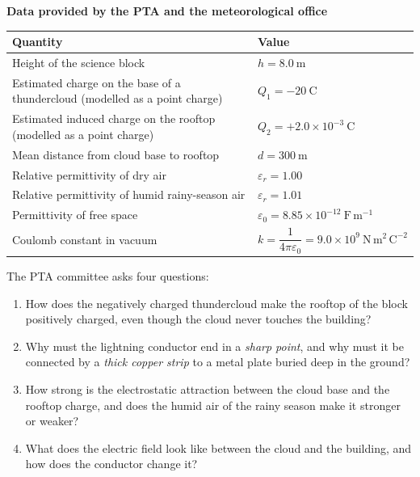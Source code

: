 \documentclass[11pt]{article}
\newcounter{popsec}
\newcounter{popsub}
\newcommand{\courssub}[1]{%
  \stepcounter{popsub}%
  \par\vspace{9pt}\noindent{\popxbold\fontsize{11.5}{13}\selectfont\color{popink}{\color{poporange}\thepopsec.\thepopsub}\hspace{6pt}#1}\par\nopagebreak\vspace{4pt}
}
\begin{document}
\textbf{Data provided by the PTA and the meteorological office}

\begin{center}
\begin{tabularx}{\linewidth}{|l|X|}
\hline
\rowcolor{popblueL} \textbf{Quantity} & \textbf{Value} \\
\hline
Height of the science block & $h = 8.0\ \mathrm{m}$ \\
\hline
Estimated charge on the base of a thundercloud (modelled as a point charge) & $Q_1 = -20\ \mathrm{C}$ \\
\hline
Estimated induced charge on the rooftop (modelled as a point charge) & $Q_2 = +2.0\times 10^{-3}\ \mathrm{C}$ \\
\hline
Mean distance from cloud base to rooftop & $d = 300\ \mathrm{m}$ \\
\hline
Relative permittivity of dry air & $\varepsilon_r = 1.00$ \\
\hline
Relative permittivity of humid rainy-season air & $\varepsilon_r = 1.01$ \\
\hline
Permittivity of free space & $\varepsilon_0 = 8.85\times 10^{-12}\ \mathrm{F\,m^{-1}}$ \\
\hline
Coulomb constant in vacuum & $k = \dfrac{1}{4\pi\varepsilon_0} = 9.0\times 10^{9}\ \mathrm{N\,m^2\,C^{-2}}$ \\
\hline
\end{tabularx}
\end{center}

The PTA committee asks four questions:
\begin{enumerate}
\item How does the negatively charged thundercloud make the rooftop of the block positively charged, even though the cloud never touches the building?
\item Why must the lightning conductor end in a \emph{sharp point}, and why must it be connected by a \emph{thick copper strip} to a metal plate buried deep in the ground?
\item How strong is the electrostatic attraction between the cloud base and the rooftop charge, and does the humid air of the rainy season make it stronger or weaker?
\item What does the electric field look like between the cloud and the building, and how does the conductor change it?
\end{enumerate}

\courssub{Tasks}
\end{document}
